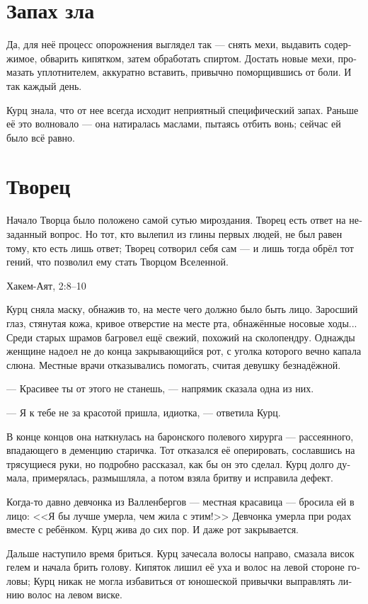 \documentclass[a4paper,12pt,fleqn]{book}\usepackage{polyglossia}\setdefaultlanguage[babelshorthands=true]{russian}\setotherlanguage{english}\defaultfontfeatures{Ligatures=TeX,Mapping=tex-text}\usepackage{xcolor}\newcommand{\ml}[3]{#2}
\begin{document}
\section{Запах зла}

Да, для неё процесс опорожнения выглядел так --- снять мехи, выдавить содержимое, обварить кипятком, затем обработать спиртом.
Достать новые мехи, промазать уплотнителем, аккуратно вставить, привычно поморщившись от боли.
И так каждый день.

Курц знала, что от нее всегда исходит неприятный специфический запах.
Раньше её это волновало --- она натиралась маслами, пытаясь отбить вонь;
сейчас ей было всё равно.

\section{Творец}

\epigraph{Начало Творца было положено самой сутью мироздания.
Творец есть ответ на незаданный вопрос.
Но тот, кто вылепил из глины первых людей, не был равен тому, кто есть лишь ответ;
Творец сотворил себя сам --- и лишь тогда обрёл тот гений, что позволил ему стать Творцом Вселенной.}
{Хакем-Аят, 2:8--10}

Курц сняла маску, обнажив то, на месте чего должно было быть лицо.
Заросший глаз, стянутая кожа, кривое отверстие на месте рта, обнажённые носовые ходы...
Среди старых шрамов багровел ещё свежий, похожий на сколопендру.
Однажды женщине надоел не до конца закрывающийся рот, с уголка которого вечно капала слюна.
Местные врачи отказывались помогать, считая девушку безнадёжной.

--- Красивее ты от этого не станешь, --- напрямик сказала одна из них.

--- Я к тебе не за красотой пришла, идиотка, --- ответила Курц.

В конце концов она наткнулась на баронского полевого хирурга --- рассеянного, впадающего в деменцию старичка.
Тот отказался её оперировать, сославшись на трясущиеся руки, но подробно рассказал, как бы он это сделал.
Курц долго думала, примерялась, размышляла, а потом взяла бритву и исправила дефект.

Когда-то давно девчонка из Валленбергов --- местная красавица --- бросила ей в лицо:
<<Я бы лучше умерла, чем жила с этим!>>
Девчонка умерла при родах вместе с ребёнком.
Курц жива до сих пор.
И даже рот закрывается.

Дальше наступило время бриться.
Курц зачесала волосы направо, смазала висок гелем и начала брить голову.
Кипяток лишил её уха и волос на левой стороне головы;
Курц никак не могла избавиться от юношеской привычки выправлять линию волос на левом виске.
\end{document}
